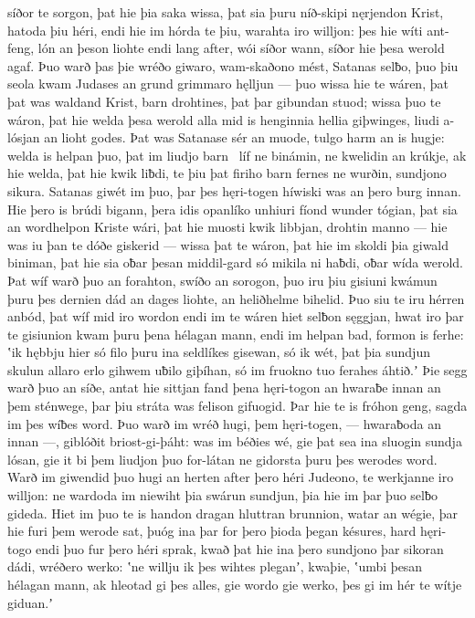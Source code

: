 síðor te sorgon, þat hie þia saka wissa,
þat sia þuru níð-skipi nęrjendon Krist,
hatoda þiu héri, endi hie im hórda te þiu,
warahta iro willjon: þes hie wíti ant-feng,
lón an þeson liohte endi lang after,
wói síðor wann, síðor hie þesa werold agaf.
Þuo warð þas þie wréðo giwaro, wam-skaðono mést,
Satanas selƀo, þuo þiu seola kwam
Judases an grund grimmaro hęlljun —
þuo wissa hie te wáren, þat þat was waldand Krist,
barn drohtines, þat þar gibundan stuod;
wissa þuo te wáron, þat hie welda þesa werold alla
mid is henginnia hellia giþwinges,
liudi a-lósjan an lioht godes.
Þat was Satanase sér an muode,
tulgo harm an is hugje: welda is helpan þuo,
þat im liudjo barn \hld\ líf ne binámin,
ne kwelidin an krúkje, ak hie welda, þat hie kwik liƀdi,
te þiu þat firiho barn fernes ne wurðin,
sundjono sikura. Satanas giwét im þuo,
þar þes hęri-togen híwiski was
an þero burg innan. Hie þero is brúdi bigann,
þera idis opanlíko unhiuri fíond
wunder tógian, þat sia an wordhelpon
Kriste wári, þat hie muosti kwik libbjan,
drohtin manno — hie was iu þan te dóðe giskerid —
wissa þat te wáron, þat hie im skoldi þia giwald biniman,
þat hie sia oƀar þesan middil-gard só mikila ni haƀdi,
oƀar wída werold. Þat wíf warð þuo an forahton,
swíðo an sorogon, þuo iru þiu gisiuni kwámun
þuru þes dernien dád an dages liohte,
an heliðhelme bihelid. Þuo siu te iru hérren anbód,
þat wíf mid iro wordon endi im te wáren hiet
selƀon sęggjan, hwat iro þar te gisiunion kwam
þuru þena hélagan mann, endi im helpan bad,
formon is ferhe: ʽik hębbju hier só filo þuru ina
seldlíkes gisewan, só ik wét, þat þia sundjun skulun
allaro erlo gihwem uƀilo giþíhan,
só im fruokno tuo ferahes áhtið.ʼ
Þie segg warð þuo an síðe, antat hie sittjan fand
þena hęri-togon an hwaraƀe innan
an þem sténwege, þar þiu stráta was
felison gifuogid. Þar hie te is fróhon geng,
sagda im þes wíƀes word. Þuo warð im wréð hugi,
þem hęri-togen, — hwaraƀoda an innan —,
giblóðit briost-gi-þáht: was im béðies wé,
gie þat sea ina sluogin sundja lósan,
gie it bi þem liudjon þuo for-látan ne gidorsta
þuru þes werodes word. Warð im giwendid þuo
hugi an herten after þero héri Judeono,
te werkjanne iro willjon: ne wardoda im niewiht
þia swárun sundjun, þia hie im þar þuo selƀo gideda.
Hiet im þuo te is handon dragan hluttran brunnion,
watar an wégie, þar hie furi þem werode sat,
þuóg ina þar for þero þioda þegan késures,
hard hęri-togo endi þuo fur þero héri sprak,
kwað þat hie ina þero sundjono þar sikoran dádi,
wréðero werko: ʽne willju ik þes wihtes pleganʼ, kwaþie,
ʽumbi þesan hélagan mann, ak hleotad gi þes alles,
gie wordo gie werko, þes gi im hér te wítje giduan.ʼ
